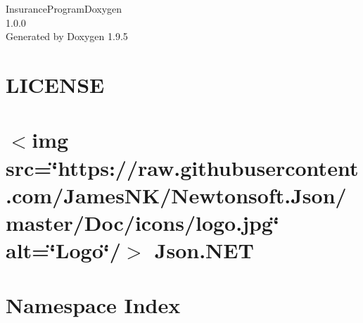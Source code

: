 \documentclass[twoside]{book}
\newcommand{\+}{\discretionary{\mbox{\scriptsize$\hookleftarrow$}}{}{}}
\newcommand{\clearemptydoublepage}{%
    \newpage{\pagestyle{empty}\cleardoublepage}%
  }
\begin{document}
  \raggedbottom
    \hypersetup{pageanchor=false,
                bookmarksnumbered=true,
                pdfencoding=unicode
               }
  \begin{titlepage}
  \vspace*{7cm}
  \begin{center}%
  {\Large Insurance\+Program\+Doxygen}\\
  [1ex]\large 1.\+0.\+0 \\
  \vspace*{1cm}
  {\large Generated by Doxygen 1.9.5}\\
  \end{center}
  \end{titlepage}
  \clearemptydoublepage
  \tableofcontents
  \clearemptydoublepage
  \hypersetup{pageanchor=true}
\chapter{LICENSE}
\label{md__c___users_ronal__one_drive__escritorio__p_r_o_y_e_c_t_o__f_i_n_a_l__p_r_o_g_r_a__i_i_i__insu23a2d6e560bf0f8c46f58b225d7ded0b}

\chapter{\texorpdfstring{$<$}{<}img src=\char`\"{}https\+://raw.\+githubusercontent.\+com/\+James\+NK/\+Newtonsoft.\+Json/master/\+Doc/icons/logo.\+jpg\char`\"{} alt=\char`\"{}\+Logo\char`\"{}/\texorpdfstring{$>$}{>} Json.\+NET}
\label{md__c___users_ronal__one_drive__escritorio__p_r_o_y_e_c_t_o__f_i_n_a_l__p_r_o_g_r_a__i_i_i__insu312c5b747b20fd59a117f855fb206bef}

\chapter{Namespace Index}

\end{document}
